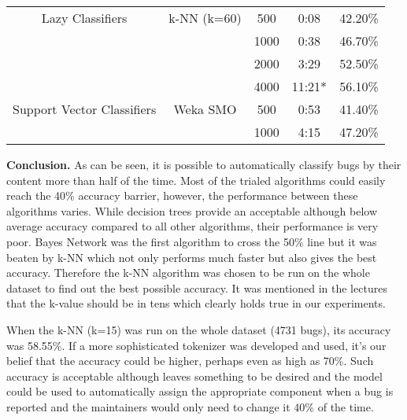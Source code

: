 \begin{tabular}{|c|c|c|c|c|}
Lazy Classifiers & k-NN (k=60) &   500  &   0:08  &    42.20\%  \\
                              &&  1000  &   0:38  &    46.70\%  \\
                              &&  2000  &   3:29  &    52.50\%  \\
                              &&  4000  &  11:21* &    56.10\%  \\

Support Vector Classifiers & Weka SMO &   500  &  0:53  &    41.40\%  \\
                                     &&  1000  &  4:15  &    47.20\%  \\

\hline
\end{tabular}

{\bf Conclusion.} As can be seen, it is possible to automatically classify bugs by their content more than half of the time. Most of the trialed algorithms could easily reach the 40\% accuracy barrier, however, the performance between these algorithms varies. While decision trees provide an acceptable although below average accuracy compared to all other algorithms, their performance is very poor. Bayes Network was the first algorithm to cross the 50\% line but it was beaten by k-NN which not only performs much faster but also gives the best accuracy. Therefore the k-NN algorithm was chosen to be run on the whole dataset to find out the best possible accuracy. It was mentioned in the lectures that the k-value should be in tens which clearly holds true in our experiments.

When the k-NN (k=15) was run on the whole dataset (4731 bugs), its accuracy was 58.55\%. If a more sophisticated tokenizer was developed and used, it's our belief that the accuracy could be higher, perhaps even as high as 70\%. Such accuracy is acceptable although leaves something to be desired and the model could be used to automatically assign the appropriate component when a bug is reported and the maintainers would only need to change it 40\% of the time.



